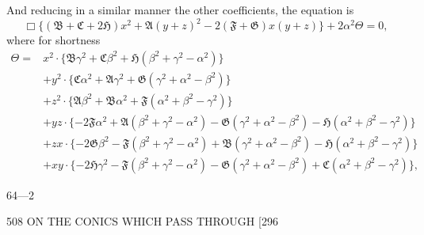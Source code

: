 \documentclass[11pt]{article}
\begin{document}
And reducing in a similar manner the other coefficients, the equation is
\[ \Box\{(\mathfrak{B}+\mathfrak{C}+2\mathfrak{H})x^{2}+\mathfrak{A}(y+z)^{2}-2(\mathfrak{F}+\mathfrak{G})x(y+z)\}+2\alpha^{2}\Theta=0, \]
where for shortness
{\small\begin{align*}
\Theta = {}& x^{2}\cdot \{\mathfrak{B}\gamma^{2}+\mathfrak{C}\beta^{2}+\mathfrak{H}(\beta^{2}+\gamma^{2}-\alpha^{2})\}\\
&+y^{2}\cdot \{\mathfrak{C}\alpha^{2}+\mathfrak{A}\gamma^{2}+\mathfrak{G}(\gamma^{2}+\alpha^{2}-\beta^{2})\}\\
&+z^{2}\cdot \{\mathfrak{A}\beta^{2}+\mathfrak{B}\alpha^{2}+\mathfrak{F}(\alpha^{2}+\beta^{2}-\gamma^{2})\}\\
&+yz\cdot \{-2\mathfrak{F}\alpha^{2}+\mathfrak{A}(\beta^{2}+\gamma^{2}-\alpha^{2})-\mathfrak{G}(\gamma^{2}+\alpha^{2}-\beta^{2})-\mathfrak{H}(\alpha^{2}+\beta^{2}-\gamma^{2})\}\\
&+zx\cdot \{-2\mathfrak{G}\beta^{2}-\mathfrak{F}(\beta^{2}+\gamma^{2}-\alpha^{2})+\mathfrak{B}(\gamma^{2}+\alpha^{2}-\beta^{2})-\mathfrak{H}(\alpha^{2}+\beta^{2}-\gamma^{2})\}\\
&+xy\cdot \{-2\mathfrak{H}\gamma^{2}-\mathfrak{F}(\beta^{2}+\gamma^{2}-\alpha^{2})-\mathfrak{G}(\gamma^{2}+\alpha^{2}-\beta^{2})+\mathfrak{C}(\alpha^{2}+\beta^{2}-\gamma^{2})\},
\end{align*}}

\begin{flushright}\small 64---2\end{flushright}

\newpage
\begin{center}
508 \hfill ON THE CONICS WHICH PASS THROUGH \hfill [296
\end{center}
\end{document}
